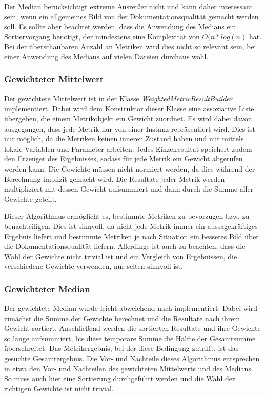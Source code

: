 Der Median berücksichtigt extreme Ausreißer nicht und kann daher interessant sein, wenn ein allgemeines Bild von der Dokumentationsqualität gemacht werden soll. Es sollte aber beachtet werden, dass die Anwendung des Medians ein Sortiervorgang benötigt, der mindestens eine Komplexität von $O(n*log(n)$ hat. Bei der überschaubaren Anzahl an Metriken wird dies nicht so relevant sein, bei einer Anwendung des Medians auf vielen Dateien durchaus wohl.


\subsubsection{Gewichteter Mittelwert}
Der gewichtete Mittelwert ist in der Klasse \textit{WeightedMetricResultBuilder} implementiert. Dabei wird dem Konstruktor dieser Klasse eine assoziative Liste übergeben, die einem Metrikobjekt ein Gewicht zuordnet.  Es wird dabei davon ausgegangen, dass jede Metrik nur von einer Instanz repräsentiert wird. Dies ist nur möglich, da die Metriken keinen inneren Zustand haben und nur mittels lokale Variablen und Parameter arbeiten. Jedes Einzelresultat speichert zudem den Erzeuger des Ergebnisses, sodass für jede Metrik ein Gewicht abgerufen werden kann. Die Gewichte müssen nicht normiert werden, da dies während der Berechnung implizit gemacht wird. Die Resultate jeder Metrik werden multipliziert mit dessen Gewicht aufsummiert und dann durch die Summe aller Gewichte geteilt. 


Dieser Algorithmus ermöglicht es, bestimmte Metriken zu bevorzugen bzw. zu benachteiligen. Dies ist sinnvoll, da nicht jede Metrik immer ein aussagekräftiges Ergebnis liefert und bestimmte Metriken je nach Situation ein besseres Bild über die Dokumentationsqualität liefern. Allerdings ist auch zu beachten, dass die Wahl der Gewichte nicht trivial ist und ein Vergleich von Ergebnissen, die verschiedene Gewichte verwenden, nur selten sinnvoll ist.

\subsubsection{Gewichteter Median}
Der gewichtete Median wurde leicht abweichend nach \cite[S. 37]{YAGER199835} implementiert. Dabei wird zunächst die Summe der Gewichte berechnet und die Resultate nach ihrem Gewicht sortiert. Anschließend werden die sortierten Resultate und ihre Gewichte so lange aufsummiert, bis diese temporäre Summe die Hälfte der Gesamtsumme überschreitet. Das Metrikergebnis, bei der diese Bedingung zutrifft, ist das gesuchte Gesamtergebnis. Die Vor- und Nachteile dieses Algorithmus entsprechen in etwa den Vor- und Nachteilen des gewichteten Mittelwerts und des Medians. So muss auch hier eine Sortierung durchgeführt werden und die Wahl der richtigen Gewichte ist nicht trivial. 



